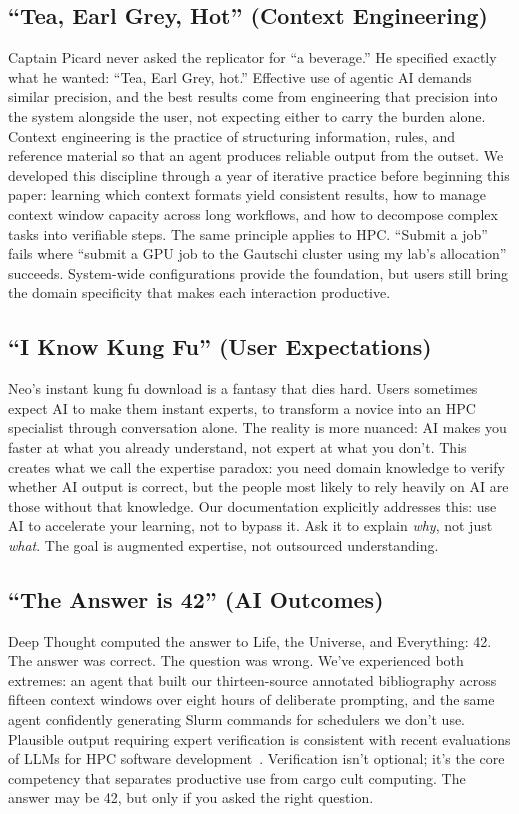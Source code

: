 \documentclass[sigconf]{acmart}
\begin{document}
\subsection{``Tea, Earl Grey, Hot'' (Context Engineering)}

Captain Picard never asked the replicator for ``a beverage.'' He specified exactly what
he wanted: ``Tea, Earl Grey, hot.'' Effective use of agentic AI demands similar precision,
and the best results come from engineering that precision into the system alongside the
user, not expecting either to carry the burden alone.
Context engineering is the practice of structuring information, rules, and reference
material so that an agent produces reliable output from the outset. We developed this
discipline through a year of iterative practice before beginning this paper: learning
which context formats yield consistent results, how to manage context window capacity
across long workflows, and how to decompose complex tasks into verifiable steps. The
same principle applies to HPC. ``Submit a job'' fails where ``submit a GPU job to the
Gautschi cluster using my lab's allocation'' succeeds. System-wide configurations
provide the foundation, but users still bring the domain specificity that makes each
interaction productive.

\subsection{``I Know Kung Fu'' (User Expectations)}

Neo's instant kung fu download is a fantasy that dies hard. Users sometimes expect AI
to make them instant experts, to transform a novice into an HPC specialist through
conversation alone. The reality is more nuanced: AI makes you faster at what you already
understand, not expert at what you don't.
This creates what we call the expertise paradox: you need domain knowledge to verify
whether AI output is correct, but the people most likely to rely heavily on AI are
those without that knowledge. Our documentation explicitly addresses this: use AI to
accelerate your learning, not to bypass it. Ask it to explain \emph{why}, not just
\emph{what}.
The goal is augmented expertise, not outsourced understanding.

\subsection{``The Answer is 42'' (AI Outcomes)}

Deep Thought computed the answer to Life, the Universe, and Everything: 42. The answer
was correct. The question was wrong. We've experienced both extremes: an agent that
built our thirteen-source annotated bibliography across fifteen context windows over
eight hours of deliberate prompting, and the same agent confidently generating Slurm
commands for schedulers we don't use. Plausible output
requiring expert verification is consistent with recent evaluations of LLMs for HPC
software development~\cite{godoy2024llm}. Verification isn't optional; it's the core
competency that separates productive use from cargo cult computing. The answer may be
42, but only if you asked the right question.
\end{document}
